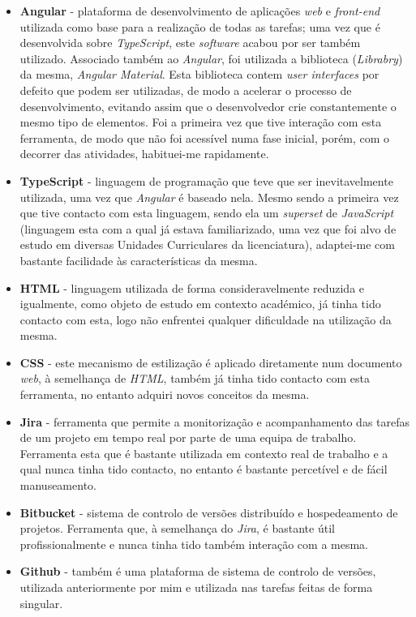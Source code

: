 \documentclass{article}
\begin{document}
\begin{itemize}
    \item \textbf{Angular} - plataforma de desenvolvimento de aplicações \emph{web} e \emph{front-end} utilizada como base para a realização de todas as tarefas; uma vez que é desenvolvida sobre \emph{TypeScript}, este \emph{software} acabou por ser também utilizado. Associado também ao \emph{Angular}, foi utilizada a biblioteca (\emph{Librabry}) da mesma, \emph{Angular Material}. Esta biblioteca contem \emph{user interfaces} por defeito que podem ser utilizadas, de modo a acelerar o processo de desenvolvimento, evitando assim que o desenvolvedor crie constantemente o mesmo tipo de elementos. Foi a primeira vez que tive interação com esta ferramenta, de modo que não foi acessível numa fase inicial, porém, com o decorrer das atividades, habituei-me rapidamente.
    \item \textbf{TypeScript} - linguagem de programação que teve que ser inevitavelmente utilizada, uma vez que \emph{Angular} é baseado nela. Mesmo sendo a primeira vez que tive contacto com esta linguagem, sendo ela um \emph{superset} de \emph{JavaScript} (linguagem esta com a qual já estava familiarizado, uma vez que foi alvo de estudo em diversas Unidades Curriculares da licenciatura), adaptei-me com bastante facilidade às características da mesma.
    \item \textbf{HTML} - linguagem utilizada de forma consideravelmente reduzida e igualmente, como objeto de estudo em contexto académico, já tinha tido contacto com esta, logo não enfrentei qualquer dificuldade na utilização da mesma.
    \item \textbf{CSS} - este mecanismo de estilização é aplicado diretamente num documento \emph{web}, à semelhança de \emph{HTML}, também já tinha tido contacto com esta ferramenta, no entanto adquiri novos conceitos da mesma.
    \item \textbf{Jira} - ferramenta que permite a monitorização e acompanhamento das tarefas de um projeto em tempo real por parte de uma equipa de trabalho. Ferramenta esta que é bastante utilizada em contexto real de trabalho e a qual nunca tinha tido contacto, no entanto é bastante percetível e de fácil manuseamento.
    \item \textbf{Bitbucket} - sistema de controlo de versões distribuído e hospedeamento de projetos. Ferramenta que, à semelhança do \emph{Jira}, é bastante útil profissionalmente e nunca tinha tido também interação com a mesma.
    \item \textbf{Github} - também é uma plataforma de sistema de controlo de versões, utilizada anteriormente por mim e utilizada nas tarefas feitas de forma singular.
\end{itemize}
\end{document}
